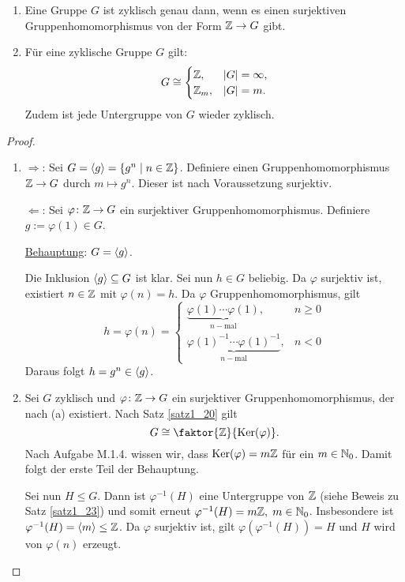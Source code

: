 \begin{satz}\label{satz2_4}
	\begin{enumerate}[label=(\alph*)]
		\item Eine Gruppe $G$ ist zyklisch genau dann, wenn es einen surjektiven Gruppenhomomorphismus von der Form $\mathbb{Z} \to G$ gibt.
		\item Für eine zyklische Gruppe $G$ gilt:
		\[G \cong \begin{cases}
			\mathbb{Z}, & |G| = \infty,\\
			\mathbb{Z}_m, & |G| = m.
		\end{cases}\]
		Zudem ist jede Untergruppe von $G$ wieder zyklisch.
	\end{enumerate}
\end{satz}
\begin{proof}
	\begin{enumerate}[label=(\alph*)]
		\item \glqq{}$\Rightarrow$\grqq: Sei $G = \langle g \rangle = \{g^n \mid n \in \mathbb{Z}\}$. Definiere einen Gruppenhomomorphismus $\mathbb{Z} \to G$ durch $m \mapsto g^n$. Dieser ist nach Voraussetzung surjektiv.
		
		\glqq{}$\Leftarrow$\grqq: Sei $\varphi \colon \mathbb{Z} \to G$ ein surjektiver Gruppenhomomorphismus. Definiere $g := \varphi(1) \in G$.
		
		\underline{Behauptung}: $G = \langle g \rangle$.
		
		Die Inklusion $\langle g \rangle \subseteq G$ ist klar. Sei nun $h \in G$ beliebig. Da $\varphi$ surjektiv ist, existiert $n \in \mathbb{Z}$ mit $\varphi(n) = h$. Da $\varphi$ Gruppenhomomorphismus, gilt
		\[h = \varphi(n) = \begin{cases}
			\underbrace{\varphi(1) \cdots \varphi(1)}_{n-\text{mal}}, & n \geq 0\\
			\underbrace{\varphi(1)^{-1} \cdots \varphi(1)^{-1}}_{n-\text{mal}}, &n < 0
		\end{cases}\]
		Daraus folgt $h = g^n \in \langle g \rangle$.
		
		\item Sei $G$ zyklisch und $\varphi \colon \mathbb{Z} \to G$ ein surjektiver Gruppenhomomorphismus, der nach (a) existiert. Nach Satz \ref{satz1_20} gilt
		\[G \cong \faktor{\Z}{\ker(\varphi)}.\]
		Nach Aufgabe M.1.4. wissen wir, dass $\mathrm{Ker}(\varphi) = m\mathbb{Z}$ für ein $m \in \mathbb{N}_0$. Damit folgt der erste Teil der Behauptung.
		
		Sei nun $H \leq G$. Dann ist $\varphi^{-1}(H)$ eine Untergruppe von $\mathbb{Z}$ (siehe Beweis zu Satz \ref{satz1_23}) und somit erneut $\varphi^{-1}(H) = m\mathbb{Z}, \; m \in\mathbb{N}_0$. Insbesondere ist $\varphi^{-1}(H) = \langle m \rangle \leq \mathbb{Z}$. Da $\varphi$ surjektiv ist, gilt $\varphi(\varphi^{-1}(H)) = H$ und $H$ wird von $\varphi(n)$ erzeugt.
	\end{enumerate}
\end{proof}
